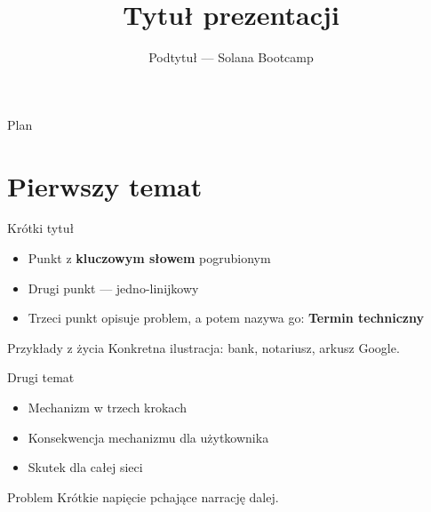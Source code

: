 

\usepackage[utf8]{inputenc}
\usepackage[T1]{fontenc}

\title{Tytuł prezentacji}
\subtitle{Podtytuł --- Solana Bootcamp}
\author{}



\maketitleframe

\begin{frame}{Plan}
  \tableofcontents
\end{frame}

\section{Pierwszy temat}

\begin{frame}{Krótki tytuł}
  \begin{itemize}
    \item Punkt z \textbf{kluczowym słowem} pogrubionym
    \item Drugi punkt --- jedno-linijkowy
    \item Trzeci punkt opisuje problem, a potem nazywa go: \textbf{Termin techniczny}
  \end{itemize}
  \vspace{0.3cm}
  \begin{exampleblock}{Przykłady z życia}
    Konkretna ilustracja: bank, notariusz, arkusz Google.
  \end{exampleblock}
\end{frame}

\begin{frame}{Drugi temat}
  \begin{itemize}
    \item Mechanizm w trzech krokach
    \item Konsekwencja mechanizmu dla użytkownika
    \item Skutek dla całej sieci
  \end{itemize}
  \vspace{0.3cm}
  \begin{alertblock}{Problem}
    Krótkie napięcie pchające narrację dalej.
  \end{alertblock}
\end{frame}

